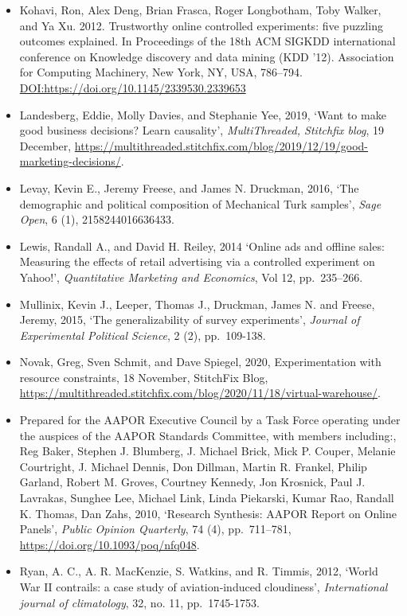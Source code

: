 \documentclass[
]{book}
\begin{document}
\begin{itemize}
\item
  Kohavi, Ron, Alex Deng, Brian Frasca, Roger Longbotham, Toby Walker, and Ya Xu. 2012. Trustworthy online controlled experiments: five puzzling outcomes explained. In Proceedings of the 18th ACM SIGKDD international conference on Knowledge discovery and data mining (KDD '12). Association for Computing Machinery, New York, NY, USA, 786--794. \url{DOI:https://doi.org/10.1145/2339530.2339653}
\item
  Landesberg, Eddie, Molly Davies, and Stephanie Yee, 2019, `Want to make good business decisions? Learn causality', \emph{MultiThreaded, Stitchfix blog}, 19 December, \url{https://multithreaded.stitchfix.com/blog/2019/12/19/good-marketing-decisions/}.
\item
  Levay, Kevin E., Jeremy Freese, and James N. Druckman, 2016, `The demographic and political composition of Mechanical Turk samples', \emph{Sage Open}, 6 (1), 2158244016636433.
\item
  Lewis, Randall A., and David H. Reiley, 2014 `Online ads and offline sales: Measuring the effects of retail advertising via a controlled experiment on Yahoo!', \emph{Quantitative Marketing and Economics}, Vol 12, pp.~235--266.
\item
  Mullinix, Kevin J., Leeper, Thomas J., Druckman, James N. and Freese, Jeremy, 2015, `The generalizability of survey experiments', \emph{Journal of Experimental Political Science}, 2 (2), pp.~109-138.
\item
  Novak, Greg, Sven Schmit, and Dave Spiegel, 2020, Experimentation with resource constraints, 18 November, StitchFix Blog, \url{https://multithreaded.stitchfix.com/blog/2020/11/18/virtual-warehouse/}.
\item
  Prepared for the AAPOR Executive Council by a Task Force operating under the auspices of the AAPOR Standards Committee, with members including:, Reg Baker, Stephen J. Blumberg, J. Michael Brick, Mick P. Couper, Melanie Courtright, J. Michael Dennis, Don Dillman, Martin R. Frankel, Philip Garland, Robert M. Groves, Courtney Kennedy, Jon Krosnick, Paul J. Lavrakas, Sunghee Lee, Michael Link, Linda Piekarski, Kumar Rao, Randall K. Thomas, Dan Zahs, 2010, `Research Synthesis: AAPOR Report on Online Panels', \emph{Public Opinion Quarterly}, 74 (4), pp.~711--781, \url{https://doi.org/10.1093/poq/nfq048}.
\item
  Ryan, A. C., A. R. MacKenzie, S. Watkins, and R. Timmis, 2012, `World War II contrails: a case study of aviation‐induced cloudiness', \emph{International journal of climatology}, 32, no. 11, pp.~1745-1753.

\end{itemize}
\end{document}
